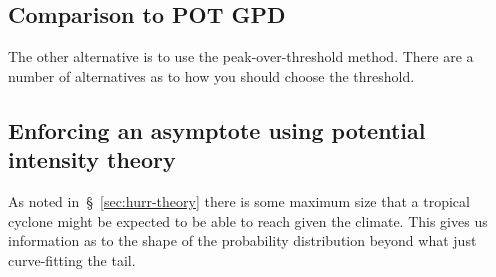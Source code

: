 



\subsection{Comparison to POT GPD}
The other alternative is to use the peak-over-threshold method.
There are a number of alternatives as to how you should choose the
threshold.

\subsection{Enforcing an asymptote using potential intensity theory }
As noted in~§~\ref{sec:hurr-theory} there is some maximum size
that a tropical cyclone might be expected to be able to reach given
the climate. This gives us information as to the shape of the probability
distribution beyond what just curve-fitting the tail.
